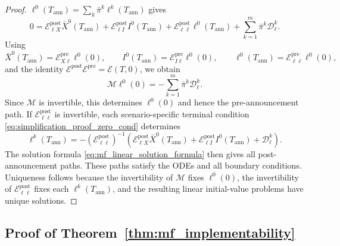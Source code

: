 \documentclass[12pt]{article}
\numberwithin{equation}{section}
\theoremstyle{definition}
\begin{document}
\begin{proof}
\(\ell^0(T_{\mathrm{ann}})=\sum_k\bar\pi^k\ell^k(T_{\mathrm{ann}})\) gives
\[
0
=
\mathcal E^{\mathrm{post}}_{\ell X}\bar X^0(T_{\mathrm{ann}})
+\mathcal E^{\mathrm{post}}_{\ell I}I^0(T_{\mathrm{ann}})
+\mathcal E^{\mathrm{post}}_{\ell\ell}\ell^0(T_{\mathrm{ann}})
+\sum_{k=1}^m\bar\pi^k\mathcal D_\ell^k.
\]
Using
\[
\bar X^0(T_{\mathrm{ann}})
=
\mathcal E^{\mathrm{pre}}_{X\ell}\ell^0(0),
\qquad
I^0(T_{\mathrm{ann}})
=
\mathcal E^{\mathrm{pre}}_{I\ell}\ell^0(0),
\qquad
\ell^0(T_{\mathrm{ann}})
=
\mathcal E^{\mathrm{pre}}_{\ell\ell}\ell^0(0),
\]
and the identity
\(\mathcal E^{\mathrm{post}}\mathcal E^{\mathrm{pre}}
=\mathcal E(T,0)\), we obtain
\begin{equation}\label{eq:mf_matching_equation}
\mathcal M\ell^0(0)
=
-\sum_{k=1}^m\bar\pi^k\mathcal D_\ell^k.
\end{equation}
Since \(\mathcal M\) is invertible, this determines \(\ell^0(0)\) and hence
the pre-announcement path. If \(\mathcal E^{\mathrm{post}}_{\ell\ell}\) is invertible, each
scenario-specific terminal condition \eqref{eq:simplification_proof_zero_cond} determines
\[
\ell^k(T_{\mathrm{ann}})
=
-(\mathcal E^{\mathrm{post}}_{\ell\ell})^{-1}
\left(\mathcal E^{\mathrm{post}}_{\ell X}\bar X^0(T_{\mathrm{ann}})+
\mathcal E^{\mathrm{post}}_{\ell I}I^0(T_{\mathrm{ann}})+\mathcal D_\ell^k\right).
\]
The solution formula \eqref{eq:mf_linear_solution_formula} then gives all
post-announcement paths. These paths satisfy the ODEs and all boundary
conditions. Uniqueness follows because the invertibility of \(\mathcal M\)
fixes \(\ell^0(0)\), the invertibility of
\(\mathcal E^{\mathrm{post}}_{\ell\ell}\) fixes each \(\ell^k(T_{\mathrm{ann}})\), and the resulting linear
initial-value problems have unique solutions.
\end{proof}

\subsection{Proof of Theorem~\ref{thm:mf_implementability}}
\label{subsec:proof_mf_implementability}
\end{document}
